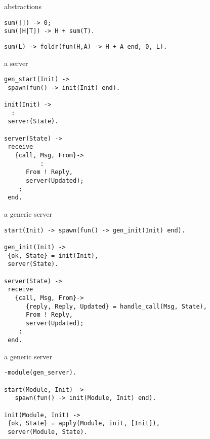 \begin{frame}[fragile]{abstractions}

\begin{verbatim}
sum([]) -> 0;
sum([H|T]) -> H + sum(T).
\end{verbatim}

\pause\vspace{20pt}

\begin{verbatim}
sum(L) -> foldr(fun(H,A) -> H + A end, 0, L).
\end{verbatim}

\end{frame}

\begin{frame}[fragile]{a server}

\begin{verbatim}
gen_start(Init) ->
 spawn(fun() -> init(Init) end).

init(Init) -> 
  :
 server(State).

server(State) ->
 receive
   {call, Msg, From}->
          :
      From ! Reply,
      server(Updated);
    :
 end.           
\end{verbatim}

\end{frame}

\begin{frame}[fragile]{a generic server}

\begin{verbatim}
start(Init) -> spawn(fun() -> gen_init(Init) end).

gen_init(Init) ->
 {ok, State} = init(Init),
 server(State).

server(State) ->
 receive
   {call, Msg, From}->
      {reply, Reply, Updated} = handle_call(Msg, State),
      From ! Reply,
      server(Updated);
    :
 end.           
\end{verbatim}

\end{frame}


\begin{frame}[fragile]{a generic server}

\begin{verbatim}
-module(gen_server).

start(Module, Init) -> 
   spawn(fun() -> init(Module, Init) end).

init(Module, Init) ->
 {ok, State} = apply(Module, init, [Init]),
 server(Module, State).
\end{verbatim}


\end{frame}


